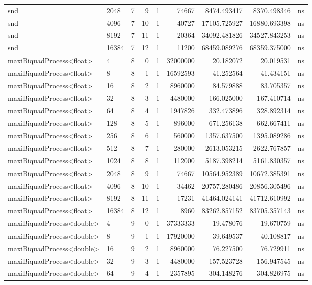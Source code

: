\begin{tabular}{llrrrrrrl}
snd & 2048 & 7 & 9 & 1 & 74667 & 8474.493417 & 8370.498346 & ns \\
snd & 4096 & 7 & 10 & 1 & 40727 & 17105.725927 & 16880.693398 & ns \\
snd & 8192 & 7 & 11 & 1 & 20364 & 34092.481826 & 34527.843253 & ns \\
snd & 16384 & 7 & 12 & 1 & 11200 & 68459.089276 & 68359.375000 & ns \\
maxiBiquadProcess<float> & 4 & 8 & 0 & 1 & 32000000 & 20.182072 & 20.019531 & ns \\
maxiBiquadProcess<float> & 8 & 8 & 1 & 1 & 16592593 & 41.252564 & 41.434151 & ns \\
maxiBiquadProcess<float> & 16 & 8 & 2 & 1 & 8960000 & 84.579888 & 83.705357 & ns \\
maxiBiquadProcess<float> & 32 & 8 & 3 & 1 & 4480000 & 166.025000 & 167.410714 & ns \\
maxiBiquadProcess<float> & 64 & 8 & 4 & 1 & 1947826 & 332.473896 & 328.892314 & ns \\
maxiBiquadProcess<float> & 128 & 8 & 5 & 1 & 896000 & 671.256138 & 662.667411 & ns \\
maxiBiquadProcess<float> & 256 & 8 & 6 & 1 & 560000 & 1357.637500 & 1395.089286 & ns \\
maxiBiquadProcess<float> & 512 & 8 & 7 & 1 & 280000 & 2613.053215 & 2622.767857 & ns \\
maxiBiquadProcess<float> & 1024 & 8 & 8 & 1 & 112000 & 5187.398214 & 5161.830357 & ns \\
maxiBiquadProcess<float> & 2048 & 8 & 9 & 1 & 74667 & 10564.952389 & 10672.385391 & ns \\
maxiBiquadProcess<float> & 4096 & 8 & 10 & 1 & 34462 & 20757.280486 & 20856.305496 & ns \\
maxiBiquadProcess<float> & 8192 & 8 & 11 & 1 & 17231 & 41464.024141 & 41712.610992 & ns \\
maxiBiquadProcess<float> & 16384 & 8 & 12 & 1 & 8960 & 83262.857152 & 83705.357143 & ns \\
maxiBiquadProcess<double> & 4 & 9 & 0 & 1 & 37333333 & 19.478076 & 19.670759 & ns \\
maxiBiquadProcess<double> & 8 & 9 & 1 & 1 & 17920000 & 39.649537 & 40.108817 & ns \\
maxiBiquadProcess<double> & 16 & 9 & 2 & 1 & 8960000 & 76.227500 & 76.729911 & ns \\
maxiBiquadProcess<double> & 32 & 9 & 3 & 1 & 4480000 & 157.523728 & 156.947545 & ns \\
maxiBiquadProcess<double> & 64 & 9 & 4 & 1 & 2357895 & 304.148276 & 304.826975 & ns \\

\end{tabular}
